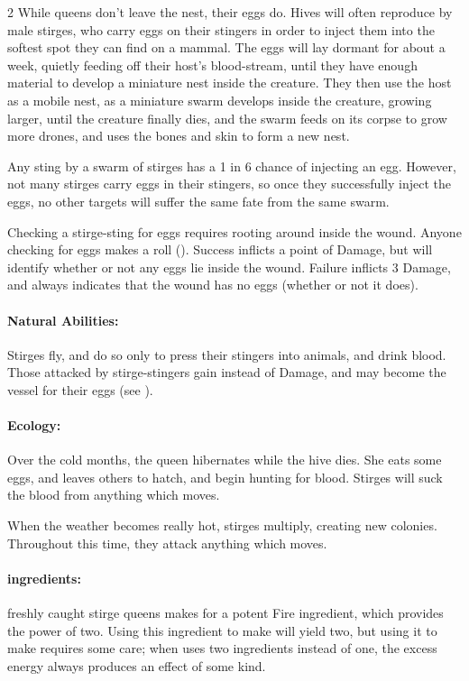 \begin{multicols}{2}
While queens don't leave the nest, their eggs do.
Hives will often reproduce by male stirges, who carry eggs on their stingers in order to inject them into the softest spot they can find on a mammal.
The eggs will lay dormant for about a week, quietly feeding off their host's blood-stream, until they have enough material to develop a miniature nest inside the creature.
They then use the host as a mobile nest, as a miniature swarm develops inside the creature, growing larger, until the creature finally dies, and the swarm feeds on its corpse to grow more drones, and uses the bones and skin to form a new nest.

\label{stirgeEggs}
Any sting by a swarm of stirges has a 1 in 6 chance of injecting an egg.
However, not many stirges carry eggs in their stingers, so once they successfully inject the eggs, no other targets will suffer the same fate from the same swarm.

Checking a stirge-sting for eggs requires rooting around inside the wound.
Anyone checking for eggs makes a  roll (\tn[12]).
Success inflicts a point of Damage, but will identify whether or not any eggs lie inside the wound.
Failure inflicts 3 Damage, and always indicates that the wound has no eggs (whether or not it does).

\paragraph{Natural Abilities:}
Stirges fly, and do so only to press their stingers into animals, and drink blood.
Those attacked by stirge-stingers gain  instead of Damage, and may become the vessel for their eggs (see ).

\paragraph{Ecology:}
Over the cold months, the queen hibernates while the hive dies.
She eats some eggs, and leaves others to hatch, and begin hunting for blood.
Stirges will suck the blood from anything which moves.

When the weather becomes really hot, stirges multiply, creating new colonies.
Throughout this time, they attack anything which moves.

\paragraph{\Glspl{ingredient}:}
freshly caught stirge queens makes for a potent Fire \gls{ingredient}, which provides the power of two.
Using this \gls{ingredient} to make  will yield two, but using it to make  requires some care; when  uses two \glspl{ingredient} instead of  one, the excess energy always produces an effect of some kind.%


\end{multicols}
